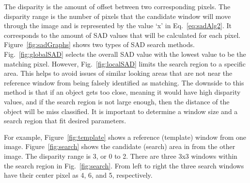 The disparity is the amount of offset between two corresponding pixels. The disparity range is the number of pixels that the candidate window will move through the image and is represented by the value `x' in Eq.~\ref{eq:sadAlg2}. It corresponds to the amount of SAD values that will be calculated for each pixel. Figure~\ref{fig:sadGraphs} shows two types of SAD search methods. Fig.~\ref{fig:globalSAD} selects the overall SAD value with the lowest value to be the matching pixel. However, Fig.~\ref{fig:localSAD} limits the search region to a specific area. This helps to avoid issues of similar looking areas that are not near the reference window from being falsely identified as matching. The downside to this method is that if an object gets too close, meaning it would have high disparity values, and if the search region is not large enough, then the distance of the object will be miss classified. It is important to determine a window size and a search region that fit desired parameters.

For example, Figure~\ref{fig:template} shows a reference (template) window from one image.  Figure~\ref{fig:search} shows the candidate (search) area in from the other image. The disparity range is 3, or 0 to 2. There are three 3x3 windows within the search region in Fig.~\ref{fig:search}. From left to right the three search windows have their center pixel as 4, 6, and 5, respectively. 


